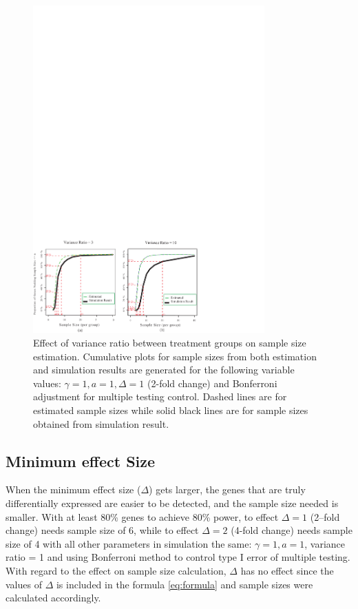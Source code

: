\documentclass{bioinfo}
\begin{document}
\begin{figure}[h]
  \centerline{\includegraphics*[width=3.5in]{ResVarF.pdf}}
  \caption[Effect of variance ratio between treatment groups on sample size estimation]
  {Effect of variance ratio between treatment groups on sample size estimation.
    Cumulative plots for sample sizes from both estimation and simulation
    results are generated for the following variable values: $\gamma = 1, a = 1, \Delta = 1$ (2-fold
    change) and Bonferroni adjustment for multiple testing control. Dashed lines are for estimated sample sizes
    while solid black lines are for sample sizes obtained from simulation result.}
  \label{fig:ResVar}
\end{figure}

\subsection{Minimum effect Size}

When the minimum effect size ($\Delta$) gets larger, the genes
that are truly differentially expressed are easier to be detected,
and the sample size needed is smaller.  With at least 80\% genes
to achieve 80\% power, to effect $\Delta = 1$ (2--fold change)
needs sample size of 6, while to effect $\Delta = 2$ (4-fold
change) needs sample size of 4 with all other parameters in
simulation the same: $\gamma = 1, a = 1$, variance ratio = 1 and
using Bonferroni method to control type I error of multiple
testing. With regard to the effect on sample size calculation,
$\Delta$ has no effect since the values of $\Delta$ is included in
the formula \ref{eq:formula} and sample sizes were calculated
accordingly.
\end{document}
